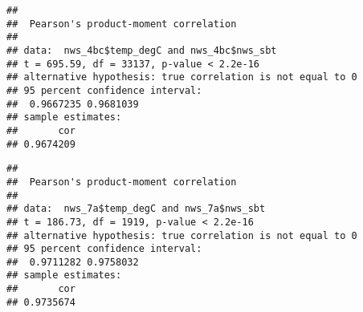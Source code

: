 \documentclass[
]{article}
\newenvironment{Shaded}{\begin{snugshade}}{\end{snugshade}}
\newcommand{\CommentTok}[1]{\textcolor[rgb]{0.56,0.35,0.01}{\textit{#1}}}
\newcommand{\FunctionTok}[1]{\textcolor[rgb]{0.00,0.00,0.00}{#1}}
\newcommand{\NormalTok}[1]{#1}
\newcommand{\OtherTok}[1]{\textcolor[rgb]{0.56,0.35,0.01}{#1}}
\newcommand{\SpecialCharTok}[1]{\textcolor[rgb]{0.00,0.00,0.00}{#1}}
\newcommand{\StringTok}[1]{\textcolor[rgb]{0.31,0.60,0.02}{#1}}
\begin{document}
\begin{Shaded}
\end{Shaded}

\begin{verbatim}
## 
##  Pearson's product-moment correlation
## 
## data:  nws_4bc$temp_degC and nws_4bc$nws_sbt
## t = 695.59, df = 33137, p-value < 2.2e-16
## alternative hypothesis: true correlation is not equal to 0
## 95 percent confidence interval:
##  0.9667235 0.9681039
## sample estimates:
##       cor 
## 0.9674209
\end{verbatim}

\begin{Shaded}
\end{Shaded}

\begin{verbatim}
## 
##  Pearson's product-moment correlation
## 
## data:  nws_7a$temp_degC and nws_7a$nws_sbt
## t = 186.73, df = 1919, p-value < 2.2e-16
## alternative hypothesis: true correlation is not equal to 0
## 95 percent confidence interval:
##  0.9711282 0.9758032
## sample estimates:
##       cor 
## 0.9735674
\end{verbatim}

\begin{Shaded}
\end{Shaded}
\end{document}
